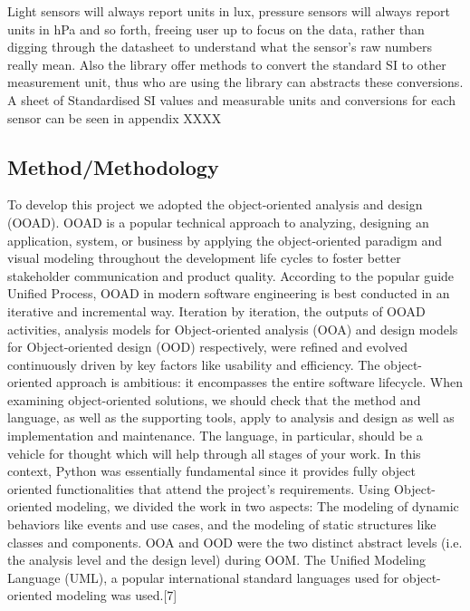 \documentclass{acm_proc_article-sp}
\begin{document}
Light sensors will always report units in lux, pressure sensors will always report units in hPa and so forth, freeing user up to focus on the data, rather than digging through the datasheet to understand what the sensor's raw numbers really mean. Also the library offer methods to convert the standard SI to other measurement unit, thus who are using the library can abstracts these conversions. A sheet of Standardised SI values and measurable units and conversions for each sensor can be seen in appendix XXXX 

\subsection{Method/Methodology}
To develop this project we adopted the object-oriented analysis and design (OOAD). OOAD is a popular technical approach to analyzing, designing an application, system, or business by applying the object-oriented paradigm and visual modeling throughout the development life cycles to foster better stakeholder communication and product quality.
\newline
\newline
According to the popular guide Unified Process, OOAD in modern software engineering is best conducted in an iterative and incremental way. Iteration by iteration, the outputs of OOAD activities, analysis models for Object-oriented analysis (OOA) and design models for Object-oriented design (OOD) respectively, were refined and evolved continuously driven by key factors like usability and efficiency.
\newline
\newline
The object-oriented approach is ambitious: it encompasses the entire software lifecycle. When examining object-oriented solutions, we should check that the method and language, as well as the supporting tools, apply to analysis and design as well as implementation and maintenance. The language, in particular, should be a vehicle for thought which will help through all stages of your work. In this context, Python was essentially fundamental since it provides fully object oriented functionalities that attend the project's requirements. 
\newline
\newline
Using Object-oriented modeling, we divided the work in two aspects: The modeling of dynamic behaviors like events and use cases, and the modeling of static structures like classes and components. OOA and OOD were the two distinct abstract levels (i.e. the analysis level and the design level) during OOM. The Unified Modeling Language (UML), a popular international standard languages used for object-oriented modeling was used.[7]
\end{document}
